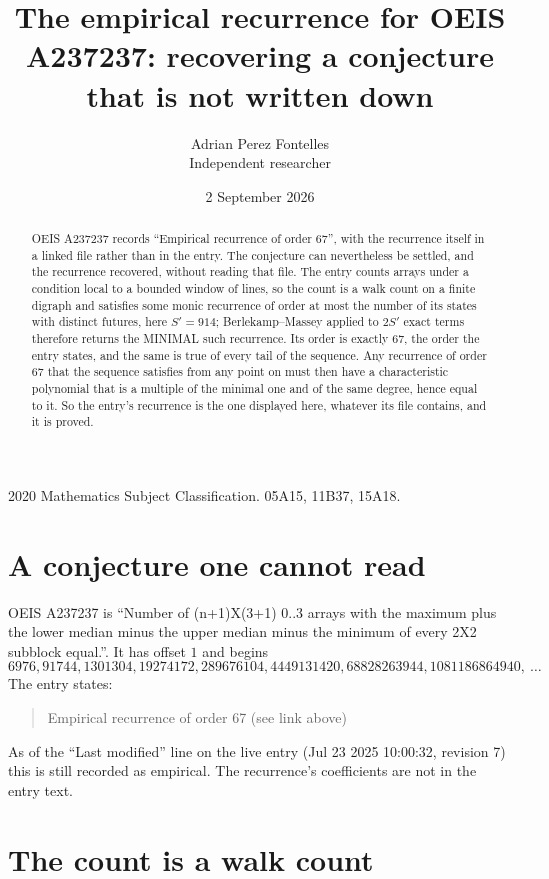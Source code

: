 \documentclass[11pt,a4paper]{article}
\title{The empirical recurrence for OEIS A237237: recovering a conjecture that is not written down}
\author{Adrian Perez Fontelles\\ \small Independent researcher}
\date{2 September 2026}
\theoremstyle{plain}
\theoremstyle{definition}
\begin{document}
\maketitle

\begin{abstract}
OEIS A237237 records ``Empirical recurrence of order $67$'', with the recurrence itself in a
linked file rather than in the entry. The conjecture can nevertheless be settled, and the
recurrence recovered, without reading that file. The entry counts arrays under a condition
local to a bounded window of lines, so the count is a walk count on a finite digraph and
satisfies some monic recurrence of order at most the number of its states with distinct
futures, here $S'=914$; Berlekamp--Massey applied to $2S'$ exact
terms therefore returns the MINIMAL such recurrence. Its order is exactly $67$, the order
the entry states, and the same is true of every tail of the sequence. Any recurrence of order
$67$ that the sequence satisfies from any point on must then have a characteristic
polynomial that is a multiple of the minimal one and of the same degree, hence equal to it. So
the entry's recurrence is the one displayed here, whatever its file contains, and it is
proved.
\end{abstract}

\noindent\small 2020 Mathematics Subject Classification. 05A15, 11B37, 15A18.\normalsize

\section{A conjecture one cannot read}

OEIS A237237 is ``Number of (n+1)X(3+1) 0..3 arrays with the maximum plus the lower median minus the upper median minus the minimum of every 2X2 subblock equal.''. It has offset $1$ and begins
\[
6976, 91744, 1301304, 19274172, 289676104, 4449131420, 68828263944, 1081186864940,\ \dots
\]
The entry states:
\begin{quote}
Empirical recurrence of order 67 (see link above)
\end{quote}
As of the ``Last modified'' line on the live entry (Jul 23 2025 10:00:32, revision 7) this is still
recorded as empirical. The recurrence's coefficients are not in the entry text.

\section{The count is a walk count}
\end{document}
